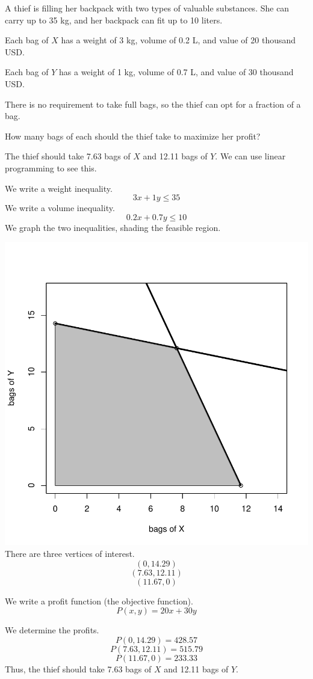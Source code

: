 
\begin{question}
A thief is filling her backpack with two types of valuable substances.
She can carry up to 35 kg, and her backpack can fit up to 10 liters.

Each bag of \(X\) has a weight of 3 kg, volume of 0.2 L, and value of 20
thousand USD.

Each bag of \(Y\) has a weight of 1 kg, volume of 0.7 L, and value of 30
thousand USD.

There is no requirement to take full bags, so the thief can opt for a
fraction of a bag.

How many bags of each should the thief take to maximize her profit?
\end{question}

\begin{solution}
The thief should take 7.63 bags of \(X\) and 12.11 bags of \(Y\). We can
use linear programming to see this.

We write a weight inequality. \[3x+1y \le 35\] We write a volume
inequality. \[0.2x+0.7y \le 10\] We graph the two inequalities, shading
the feasible region.

\includegraphics{unnamed-chunk-1-1-2.pdf}\\

There are three vertices of interest. \[(0,14.29) \] \[(7.63,12.11) \]
\[(11.67,0)\]

We write a profit function (the objective function).
\[P(x,y) = 20x+30y \]

We determine the profits. \[P(0,14.29)=428.57 \]
\[P(7.63,12.11)=515.79 \] \[P(11.67,0)=233.33 \] Thus, the thief should
take 7.63 bags of \(X\) and 12.11 bags of \(Y\).
\end{solution}

